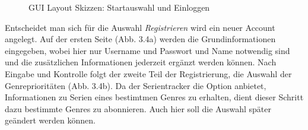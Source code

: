 \begin{figure}[h!]
\centering
\hfill %
\hfill %
\hfill %
\caption{GUI Layout Skizzen: Startauswahl und Einloggen }
\label{gui-skizzen-start-login}
\end{figure}




\newpage

Entscheidet man sich für die Auswahl \textit{Registrieren} wird ein neuer Account angelegt. Auf der ersten Seite (Abb. 3.4a) werden die Grundinformationen eingegeben, wobei hier nur Username und Passwort und Name notwendig sind und die zusätzlichen Informationen jederzeit ergänzt werden können. Nach Eingabe und Kontrolle folgt der zweite Teil der Registrierung, die Auswahl der Genreprioritäten (Abb. 3.4b). Da der Serientracker die Option anbietet, Informationen zu Serien eines bestimtmen Genres zu erhalten, dient dieser Schritt dazu bestimmte Genres zu abonnieren. Auch hier soll die Auswahl später geändert werden können.\\

